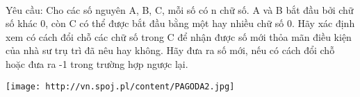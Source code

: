  

Yêu cầu: Cho các số nguyên A, B, C, mỗi số có n chữ số. A và B bắt đầu bởi chữ số khác 0, còn C có thể được bắt đầu bằng một hay nhiều chữ số 0. Hãy xác định xem có cách đổi chỗ các chữ số trong C để nhận được số mới thỏa mãn điều kiện của nhà sư trụ trì đã nêu hay không. Hãy đưa ra số mới, nếu có cách đổi chỗ hoặc đưa ra -1 trong trường hợp ngược lại.


\texttt{[image: http://vn.spoj.pl/content/PAGODA2.jpg]}